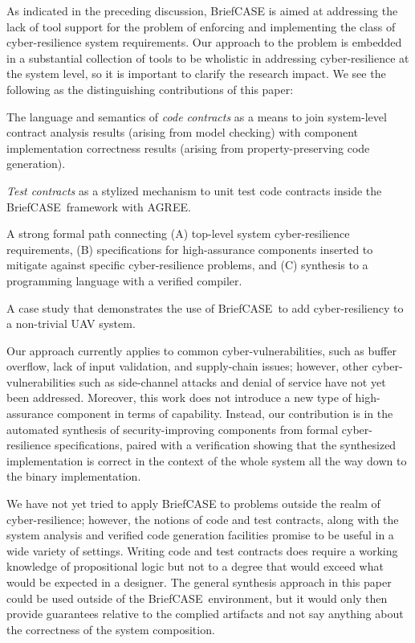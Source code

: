\documentclass[global,twocolumn]{svjour}
\newcommand{\brfcs}{BriefCASE}
\newcommand{\agr}{AGREE}
\begin{document}
As indicated in the preceding discussion, {\brfcs} is aimed at addressing the lack of tool support for the problem of enforcing and implementing the class of cyber-resilience system requirements.
%
Our approach to the problem is embedded in a substantial collection of tools to be wholistic in addressing cyber-resilience at the system level, so it is important to clarify the
research impact.
%
We see the following as the distinguishing contributions of this paper:
\begin{compactitem}
  \item The language and semantics of \emph{code contracts} as a means to join system-level contract analysis results (arising from model checking) with component implementation correctness results (arising from property-preserving code generation).
  \item \emph{Test contracts} as a stylized mechanism to unit test code contracts inside the \brfcs\ framework with \agr.
  \item A strong formal path connecting (A) top-level system cyber-resilience requirements, (B) specifications for high-assurance components inserted to mitigate against specific cyber-resilience problems, and (C) synthesis to a programming language with a verified compiler.
  \item A case study that demonstrates the use of \brfcs\ to add cyber-resiliency to a non-trivial UAV system.
\end{compactitem}

Our approach currently applies to common cyber-vulnerabilities, such as buffer overflow, lack of input validation, and supply-chain issues;
%
however, other cyber-vulnerabilities such as side-channel attacks and denial of service have not yet been addressed. Moreover, this work does not introduce a new type of high-assurance component in terms of capability.
%
Instead, our contribution is in the automated synthesis of security-improving components from formal cyber-resilience specifications, paired with a verification showing that the synthesized implementation is correct in the context of the whole system all the way down to the binary implementation.

We have not yet tried to apply {\brfcs} to problems outside the realm of cyber-resilience;
%
however, the notions of code and test contracts, along with the system analysis and verified code generation facilities promise to be useful in a wide variety of settings.
%
Writing code and test contracts does require a working knowledge of propositional logic but not to a degree that would exceed what would be expected in a designer.
%
The general synthesis approach in this paper could be used outside of the \brfcs\ environment, but it would only then provide guarantees relative to the complied artifacts and not say anything about the correctness of the system composition.
\end{document}
